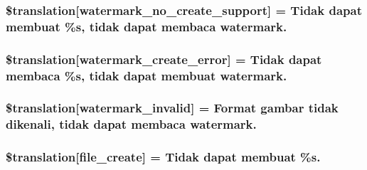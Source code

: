\subsubsection[{\$translation}]{\setlength{\rightskip}{0pt plus 5cm}\$translation\mbox{[}\textquotesingle{}watermark\+\_\+no\+\_\+create\+\_\+support\textquotesingle{}\mbox{]} = \textquotesingle{}Tidak dapat membuat \%s, tidak dapat membaca watermark.\textquotesingle{}}\label{class_8upload_8id___i_d_8php_a82d5853430ab72dc1f9799ec36144cc6}
\hypertarget{class_8upload_8id___i_d_8php_aabca0b65dadbc6184415c16375f284ca}{}
\subsubsection[{\$translation}]{\setlength{\rightskip}{0pt plus 5cm}\$translation\mbox{[}\textquotesingle{}watermark\+\_\+create\+\_\+error\textquotesingle{}\mbox{]} = \textquotesingle{}Tidak dapat membaca \%s, tidak dapat membuat watermark.\textquotesingle{}}\label{class_8upload_8id___i_d_8php_aabca0b65dadbc6184415c16375f284ca}
\hypertarget{class_8upload_8id___i_d_8php_ac336e7a5701e47ba4a05e9e498a3cc44}{}
\subsubsection[{\$translation}]{\setlength{\rightskip}{0pt plus 5cm}\$translation\mbox{[}\textquotesingle{}watermark\+\_\+invalid\textquotesingle{}\mbox{]} = \textquotesingle{}Format gambar tidak dikenali, tidak dapat membaca watermark.\textquotesingle{}}\label{class_8upload_8id___i_d_8php_ac336e7a5701e47ba4a05e9e498a3cc44}
\hypertarget{class_8upload_8id___i_d_8php_a1ecb4673e4fb69e06b3f20b65cecf30a}{}
\subsubsection[{\$translation}]{\setlength{\rightskip}{0pt plus 5cm}\$translation\mbox{[}\textquotesingle{}file\+\_\+create\textquotesingle{}\mbox{]} = \textquotesingle{}Tidak dapat membuat \%s.\textquotesingle{}}\label{class_8upload_8id___i_d_8php_a1ecb4673e4fb69e06b3f20b65cecf30a}
\hypertarget{class_8upload_8id___i_d_8php_a4712d7ec28e9a7f17eb3338af2358363}{}
